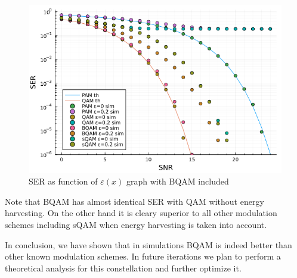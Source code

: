 \documentclass[11pt,a4paper,onecolumn,final]{article}
\newcommand{\en}[1]{\foreignlanguage{english}{#1}}
\newcommand{\eps}{\varepsilon}
\begin{document}
\begin{figure}[h]
    \centering
    \includegraphics[scale=0.58]{bqam_ex2_b.png}
    \caption{SER as function of \(\eps(x)\) graph with BQAM included}
\end{figure}

\newpage
Note that BQAM has almost identical SER with QAM without energy harvesting. On the other hand it is cleary superior to all other modulation schemes including sQAM when energy harvesting is taken into account.  

In conclusion, we have shown that in simulations BQAM is indeed better than other known modulation schemes. 
In future iterations we plan to perform a theoretical analysis for this constellation and further optimize it. 




\en{}
\end{document}
